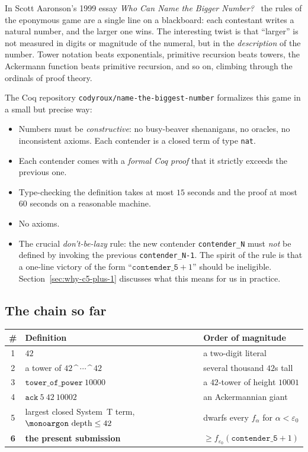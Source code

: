 \documentclass[11pt,a4paper]{article}
\theoremstyle{plain}
\theoremstyle{definition}
\theoremstyle{remark}
\newcommand{\opname}[1]{\mathop{\text{\monoargon #1}}\nolimits}
\newcommand{\depth}{\opname{depth}}
\begin{document}
In Scott Aaronson's 1999 essay
\emph{Who Can Name the Bigger Number?}~\cite{aaronson} the rules of
the eponymous game are a single line on a blackboard: each contestant
writes a natural number, and the larger one wins.  The interesting twist
is that ``larger'' is not measured in digits or magnitude of the numeral,
but in the \emph{description} of the number.  Tower notation beats
exponentials, primitive recursion beats towers, the Ackermann function
beats primitive recursion, and so on, climbing through the ordinals of
proof theory.

The Coq repository \texttt{codyroux/name-the-biggest-number} formalizes
this game in a small but precise way:

\begin{itemize}[leftmargin=2em]
  \item Numbers must be \emph{constructive}: no busy-beaver shenanigans,
        no oracles, no inconsistent axioms.  Each contender is a closed
        term of type \texttt{nat}.
  \item Each contender comes with a \emph{formal Coq proof} that it
        strictly exceeds the previous one.
  \item Type-checking the definition takes at most $15$ seconds and
        the proof at most $60$ seconds on a reasonable machine.
  \item No axioms.
  \item The crucial \emph{don't-be-lazy} rule: the new contender
        \texttt{contender\_N} must \emph{not} be defined by invoking the
        previous \texttt{contender\_N-1}.  The spirit of the rule is
        that a one-line victory of the form ``$\texttt{contender\_5} +
        1$'' should be ineligible.  Section~\ref{sec:why-c5-plus-1}
        discusses what this means for us in practice.
\end{itemize}

\subsection{The chain so far}

\begin{center}
\begin{tabular}{cl@{\ }l}
\toprule
\# & Definition & Order of magnitude \\
\midrule
1 & $42$ & a two-digit literal \\
2 & a tower of $42$\,\textasciicircum\,$\cdots$\,\textasciicircum\,$42$ & several thousand $42$s tall \\
3 & $\texttt{tower\_of\_power}\ 10000$ & a $42$-tower of height $10001$ \\
4 & $\texttt{ack}\ 5\ 42\ 10002$ & an Ackermannian giant \\
5 & largest closed System~T term, $\depth \leq 42$ & dwarfs every $f_\alpha$ for $\alpha < \varepsilon_0$ \\
\textbf{6} & \textbf{the present submission} & $\geq f_{\varepsilon_0}(\texttt{contender\_5}+1)$ \\
\bottomrule
\end{tabular}
\end{center}
\end{document}
